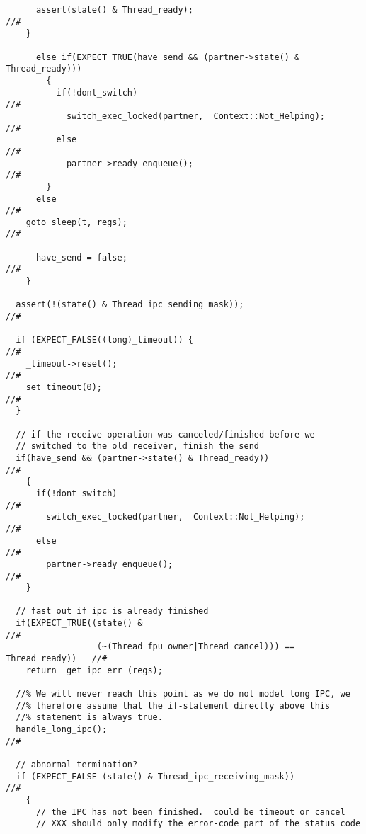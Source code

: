 \begin{lstlisting}
	  assert(state() & Thread_ready);                                  //#
	}

      else if(EXPECT_TRUE(have_send && (partner->state() & Thread_ready)))
        {
          if(!dont_switch)                                                 //#
    	    switch_exec_locked(partner,  Context::Not_Helping);            //#
          else                                                             //#
            partner->ready_enqueue();                                      //#
        }
      else                                                                 //#
	goto_sleep(t, regs);                                               //#
      
      have_send = false;                                                   //#
    }
  
  assert(!(state() & Thread_ipc_sending_mask));                            //#

  if (EXPECT_FALSE((long)_timeout)) {                                      //#
    _timeout->reset();                                                     //#
    set_timeout(0);                                                        //#
  }

  // if the receive operation was canceled/finished before we 
  // switched to the old receiver, finish the send
  if(have_send && (partner->state() & Thread_ready))                       //#
    {
      if(!dont_switch)                                                     //#
        switch_exec_locked(partner,  Context::Not_Helping);                //#
      else                                                                 //#
        partner->ready_enqueue();                                          //#  
    }

  // fast out if ipc is already finished
  if(EXPECT_TRUE((state() &                                                //#
                  (~(Thread_fpu_owner|Thread_cancel))) == Thread_ready))   //#
    return  get_ipc_err (regs);

  //% We will never reach this point as we do not model long IPC, we 
  //% therefore assume that the if-statement directly above this 
  //% statement is always true.
  handle_long_ipc();                                                       //#

  // abnormal termination?
  if (EXPECT_FALSE (state() & Thread_ipc_receiving_mask))                  //#
    {
      // the IPC has not been finished.  could be timeout or cancel
      // XXX should only modify the error-code part of the status code


\end{lstlisting}
